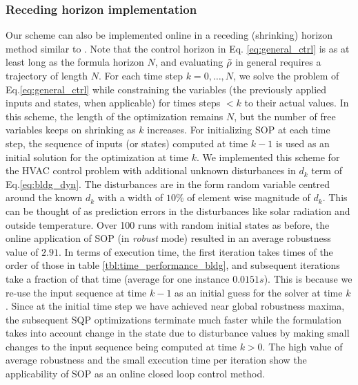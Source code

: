 \subsubsection{Receding horizon implementation} 
\label{sec:online}
Our scheme can also be implemented online in a receding (shrinking) horizon method similar to \cite{Raman14_MPCSTL}. Note that the control horizon in Eq. \ref{eq:general_ctrl} is as at least long as the formula horizon $N$, and evaluating $\tilde{\rho}$ in general requires a trajectory of length $N$. 
For each time step $k=0,\dotsc,N$, we solve the problem of Eq.\ref{eq:general_ctrl} while constraining the variables (the previously applied inputs and states, when applicable) for times steps $<k$ to their actual values. In this scheme, the length of the optimization remains $N$, but the number of free variables keeps on shrinking as $k$ increases. For initializing SOP at each time step, the sequence of inputs (or states) computed at time $k-1$ is used as an initial solution for the optimization at time $k$. 
We implemented this scheme for the HVAC control problem with additional unknown disturbances in $d_k$ term of Eq.\ref{eq:bldg_dyn}.
The disturbances are in the form random variable centred around the known $d_k$ with a width of $10\%$ of element wise magnitude of $d_k$. This can be thought of as prediction errors in the disturbances like solar radiation and outside temperature. Over 100 runs with random initial states as before, the online application of SOP (in \textit{robust} mode) resulted in an average robustness value of $2.91$. In terms of execution time, the first iteration takes times of the order of those in table \ref{tbl:time_performance_bldg}, and subsequent iterations take a fraction of that time (average for one instance $0.0151s$). This is because we re-use the input sequence at time $k-1$ as an initial guess for the solver at time $k$. Since at the initial time step we have achieved near global robustness maxima, the subsequent SQP optimizations terminate much faster while the formulation takes into account change in the state due to disturbance values by making small changes to the input sequence being computed at time $k>0$. The high value of average robustness and the small execution time per iteration show the applicability of SOP as an online closed loop control method. 
